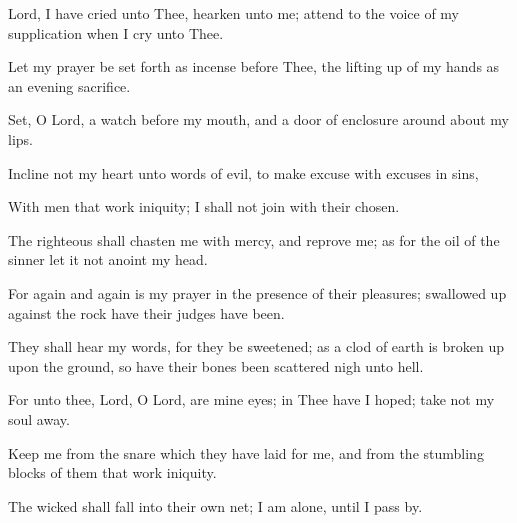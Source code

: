 Lord, I have cried unto Thee, hearken unto me; attend to the voice of my supplication when I cry unto Thee.

Let my prayer be set forth as incense before Thee, the lifting up of my hands as an evening sacrifice.

Set, O Lord, a watch before my mouth, and a door of enclosure around about my lips.

Incline not my heart unto words of evil, to make excuse with excuses in sins,

With men that work iniquity; I shall not join with their chosen.

The righteous shall chasten me with mercy, and reprove me; as for the oil of the sinner let it not anoint my head.

For again and again is my prayer in the presence of their pleasures; swallowed up against the rock have their judges have been.

They shall hear my words, for they be sweetened; as a clod of earth is broken up upon the ground, so have their bones been scattered nigh unto hell.

For unto thee, Lord, O Lord, are mine eyes; in Thee have I hoped; take not my soul away.

Keep me from the snare which they have laid for me, and from the stumbling blocks of them that work iniquity.

The wicked shall fall into their own net; I am alone, until I pass by.
